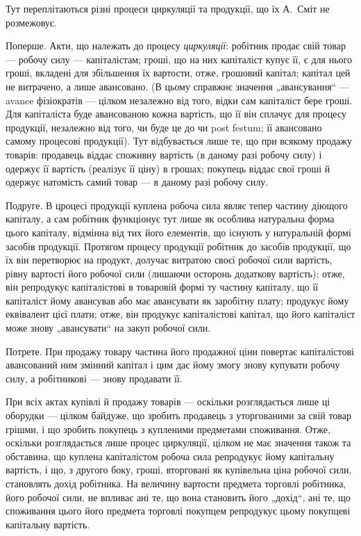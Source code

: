 Тут переплітаються різні процеси циркуляції та продукції, що їх А.~Сміт не розмежовує.

Поперше. Акти, що належать до процесу \emph{циркуляції}: робітник продає свій товар — робочу силу —
капіталістам; гроші, що на них капіталіст купує її, є для нього гроші, вкладені для збільшення їх
вартости, отже, грошовий капітал; капітал цей не витрачено, а лише авансовано. (В цьому справжнє
значення „авансування“ — avance фізіократів — цілком незалежно від того, відки сам капіталіст бере
гроші. Для капіталіста буде авансованою кожна вартість, що її він сплачує для процесу продукції,
незалежно від того, чи буде це до чи post festum; її авансовано самому процесові продукції). Тут
відбувається лише те, що при всякому продажу товарів: продавець віддає споживну вартість (в даному
разі робочу силу) і одержує її вартість (реалізує її ціну) в грошах; покупець віддає свої гроші й
одержує натомість самий товар — в даному разі робочу силу.

Подруге. В цроцесі продукції куплена робоча сила являє тепер частину діющого капіталу, а сам
робітник функціонує тут лише як особлива натуральна форма цього капіталу, відмінна від тих його
елементів, що існують у натуральній формі засобів продукції. Протягом процесу продукції робітник до
засобів продукції, що їх він перетворює на продукт, долучає витратою своєї робочої сили вартість,
рівну вартості його робочої
сили (лишаючи осторонь додаткову вартість); отже, він репродукує капіталістові в товаровій
формі ту частину капіталу, що її капіталіст йому авансував або має авансувати як заробітну плату;
продукує йому еквівалент цієї плати; отже, він продукує капіталістові капітал, що його капіталіст
може знову „авансувати“ на закуп робочої сили.

Потрете. При продажу товару частина його продажної ціни повертає капіталістові авансований ним
змінний капітал і цим дає йому змогу знову купувати робочу силу, а робітникові — знову продавати її.

При всіх актах купівлі й продажу товарів — оскільки розглядається лише ці оборудки — цілком байдуже,
що зробить продавець з уторгованими за свій товар грішми, і що зробить покупець з купленими
предметами споживання. Отже, оскільки розглядається лише процес циркуляції, цілком не має значення
також та обставина, що куплена капіталістом робоча сила репродукує йому капітальну вартість, і що, з
другого боку,
гроші, вторговані як купівельна ціна робочої сили, становлять дохід робітника. На величину вартости
предмета торговлі робітника, його робочої сили, не впливає ані те, що вона становить його „дохід“,
ані те, що споживання цього його предмета торговлі покупцем репродукує цьому покупцеві капітальну
вартість.

